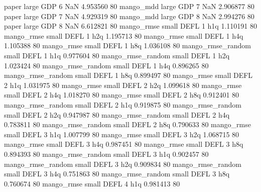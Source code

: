             paper      large      GDP                 6                  NaN 4.953560 80
        mango_mdd      large      GDP                 7                  NaN 2.906877 80
            paper      large      GDP                 7                  NaN 4.929319 80
        mango_mdd      large      GDP                 8                  NaN 2.994276 80
            paper      large      GDP                 8                  NaN 6.612821 80
       mango_rmse      small     DEFL                 1                  h1q 1.110191 80
       mango_rmse      small     DEFL                 1                  h2q 1.195713 80
       mango_rmse      small     DEFL                 1                  h4q 1.105388 80
       mango_rmse      small     DEFL                 1                  h8q 1.036108 80
mango_rmse_random      small     DEFL                 1                  h1q 0.977604 80
mango_rmse_random      small     DEFL                 1                  h2q 1.023424 80
mango_rmse_random      small     DEFL                 1                  h4q 0.896265 80
mango_rmse_random      small     DEFL                 1                  h8q 0.899497 80
       mango_rmse      small     DEFL                 2                  h1q 1.031975 80
       mango_rmse      small     DEFL                 2                  h2q 1.099618 80
       mango_rmse      small     DEFL                 2                  h4q 1.018270 80
       mango_rmse      small     DEFL                 2                  h8q 0.912401 80
mango_rmse_random      small     DEFL                 2                  h1q 0.919875 80
mango_rmse_random      small     DEFL                 2                  h2q 0.947987 80
mango_rmse_random      small     DEFL                 2                  h4q 0.783811 80
mango_rmse_random      small     DEFL                 2                  h8q 0.790633 80
       mango_rmse      small     DEFL                 3                  h1q 1.007799 80
       mango_rmse      small     DEFL                 3                  h2q 1.068715 80
       mango_rmse      small     DEFL                 3                  h4q 0.987451 80
       mango_rmse      small     DEFL                 3                  h8q 0.894393 80
mango_rmse_random      small     DEFL                 3                  h1q 0.902457 80
mango_rmse_random      small     DEFL                 3                  h2q 0.909834 80
mango_rmse_random      small     DEFL                 3                  h4q 0.751863 80
mango_rmse_random      small     DEFL                 3                  h8q 0.760674 80
       mango_rmse      small     DEFL                 4                  h1q 0.981413 80
